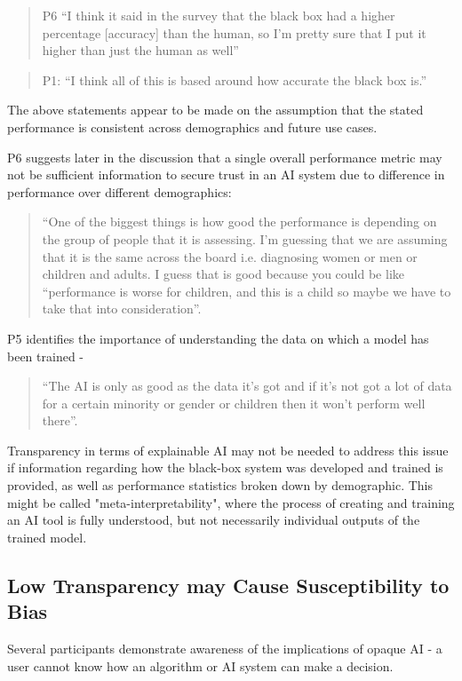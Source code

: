 \documentclass[manuscript,screen,review]{acmart}
\begin{document}
\begin{quote}
P6 “I think it said in the survey that the black box had a higher percentage [accuracy] than the human, so I'm pretty sure that I put it higher than just the human as well”
\end{quote}

\begin{quote}
P1: “I think all of this is based around how accurate the black box is.” 
\end{quote}

The above statements appear to be made on the assumption that the stated performance is consistent across demographics and future use cases.

P6 suggests later in the discussion that a single overall performance metric may not be sufficient information to secure trust in an AI system due to difference in performance over different demographics:

\begin{quote}
“One of the biggest things is how good the performance is depending on the group of people that it is assessing. I'm guessing that we are assuming that it is the same across the board i.e. diagnosing women or men or children and adults. I guess that is good because you could be like “performance is worse for children, and this is a child so maybe we have to take that into consideration”.
\end{quote}

P5 identifies the importance of understanding the data on which a model has been trained -

\begin{quote}
 “The AI is only as good as the data it's got and if it's not got a lot of data for a certain minority or gender or children then it won't perform well there”.
 \end{quote}
 
 Transparency in terms of explainable AI may not be needed to address this issue if information regarding how the black-box system was developed and trained is provided, as well as performance statistics broken down by demographic. This might be called "meta-interpretability", where the process of creating and training an AI tool is fully understood, but not necessarily individual outputs of the trained model.


\subsection{Low Transparency may Cause Susceptibility to Bias} 
Several participants demonstrate awareness of the implications of opaque AI - a user cannot know how an algorithm or AI system can make a decision.
\end{document}

